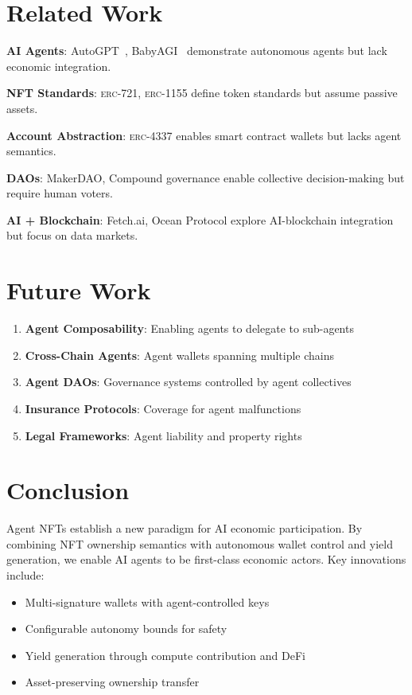 \documentclass[11pt,letterpaper]{article}
\newcommand{\ERC}{\textsc{erc}}
\begin{document}
\section{Related Work}

\textbf{AI Agents}: AutoGPT~\cite{autogpt2023}, BabyAGI~\cite{babyagi2023} demonstrate autonomous agents but lack economic integration.

\textbf{NFT Standards}: \ERC{}-721, \ERC{}-1155 define token standards but assume passive assets.

\textbf{Account Abstraction}: \ERC{}-4337 enables smart contract wallets but lacks agent semantics.

\textbf{DAOs}: MakerDAO, Compound governance enable collective decision-making but require human voters.

\textbf{AI + Blockchain}: Fetch.ai, Ocean Protocol explore AI-blockchain integration but focus on data markets.

\section{Future Work}

\begin{enumerate}
    \item \textbf{Agent Composability}: Enabling agents to delegate to sub-agents
    \item \textbf{Cross-Chain Agents}: Agent wallets spanning multiple chains
    \item \textbf{Agent DAOs}: Governance systems controlled by agent collectives
    \item \textbf{Insurance Protocols}: Coverage for agent malfunctions
    \item \textbf{Legal Frameworks}: Agent liability and property rights
\end{enumerate}

\section{Conclusion}

Agent NFTs establish a new paradigm for AI economic participation. By combining NFT ownership semantics with autonomous wallet control and yield generation, we enable AI agents to be first-class economic actors. Key innovations include:

\begin{itemize}
    \item Multi-signature wallets with agent-controlled keys
    \item Configurable autonomy bounds for safety
    \item Yield generation through compute contribution and DeFi
    \item Asset-preserving ownership transfer
\end{itemize}
\end{document}
